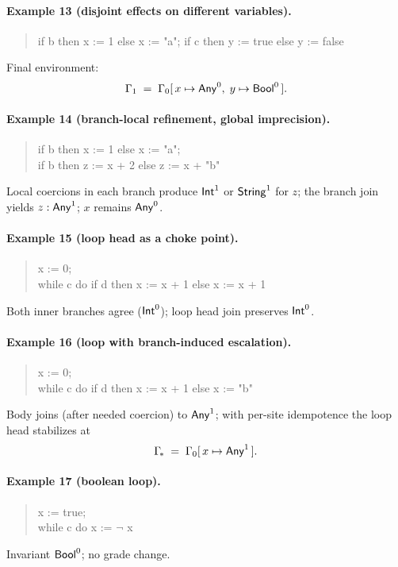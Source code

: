 \paragraph{Example 13 (disjoint effects on different variables).}
\begin{quote}\ttfamily
if b then x := 1 else x := "a";\quad
if c then y := true else y := false
\end{quote}
Final environment:
\[
\Gamma_1 \;=\; \Gamma_0[\,x \mapsto \mathsf{Any}^{0},\; y \mapsto \mathsf{Bool}^{0}\,].
\]

\paragraph{Example 14 (branch-local refinement, global imprecision).}
\begin{quote}\ttfamily
if b then x := 1 else x := "a";\\
if b then z := x + 2 else z := x + "b"
\end{quote}
Local coercions in each branch produce $\mathsf{Int}^{1}$ or $\mathsf{String}^{1}$ for $z$; the branch join yields $z:\mathsf{Any}^{1}$; $x$ remains $\mathsf{Any}^{0}$.

\paragraph{Example 15 (loop head as a choke point).}
\begin{quote}\ttfamily
x := 0;\\
while c do if d then x := x + 1 else x := x + 1
\end{quote}
Both inner branches agree ($\mathsf{Int}^{0}$); loop head join preserves $\mathsf{Int}^{0}$.

\paragraph{Example 16 (loop with branch-induced escalation).}
\begin{quote}\ttfamily
x := 0;\\
while c do if d then x := x + 1 else x := "b"
\end{quote}
Body joins (after needed coercion) to $\mathsf{Any}^{1}$; with per-site idempotence the loop head stabilizes at
\[
\Gamma_{\!*} \;=\; \Gamma_0[\,x \mapsto \mathsf{Any}^{1}\,].
\]

\paragraph{Example 17 (boolean loop).}
\begin{quote}\ttfamily
x := true;\\
while c do x := $\neg$ x
\end{quote}
Invariant $\mathsf{Bool}^{0}$; no grade change.

